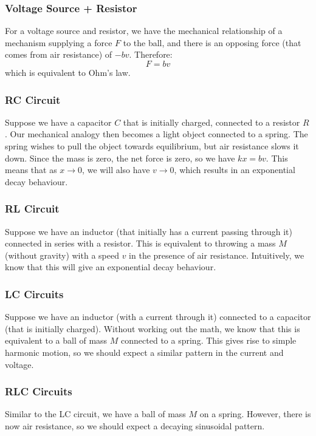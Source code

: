 \documentclass{article}
\begin{document}
\subsubsection*{Voltage Source + Resistor}
For a voltage source and resistor, we have the mechanical relationship of a mechanism supplying a force $F$ to the ball, and there is an opposing force (that comes from air resistance) of $-bv$. Therefore:
\begin{equation}
    F = bv
\end{equation}
which is equivalent to Ohm's law.
\subsubsection*{RC Circuit}
Suppose we have a capacitor $C$ that is initially charged, connected to a resistor $R$. Our mechanical analogy then becomes a light object connected to a spring. The spring wishes to pull the object towards equilibrium, but air resistance slows it down. Since the mass is zero, the net force is zero, so we have $kx=bv$. This means that as $x\to 0$, we will also have $v\to 0$, which results in an exponential decay behaviour.
\subsubsection*{RL Circuit}
Suppose we have an inductor (that initially has a current passing through it) connected in series with a resistor. This is equivalent to throwing a mass $M$ (without gravity) with a speed $v$ in the presence of air resistance. Intuitively, we know that this will give an exponential decay behaviour.
\subsubsection*{LC Circuits}
Suppose we have an inductor (with a current through it) connected to a capacitor (that is initially charged). Without working out the math, we know that this is equivalent to a ball of mass $M$ connected to a spring. This gives rise to simple harmonic motion, so we should expect a similar pattern in the current and voltage.
\subsubsection*{RLC Circuits}
Similar to the LC circuit, we have a ball of mass $M$ on a spring. However, there is now air resistance, so we should expect a decaying sinusoidal pattern.
\end{document}
